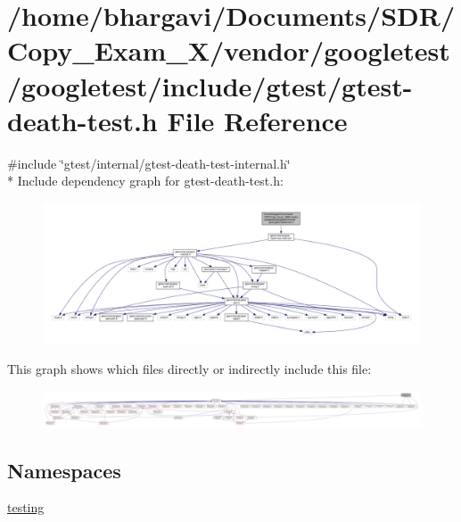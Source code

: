 \hypertarget{gtest-death-test_8h}{}\section{/home/bhargavi/\+Documents/\+S\+D\+R/\+Copy\+\_\+\+Exam\+\_\+X/vendor/googletest/googletest/include/gtest/gtest-\/death-\/test.h File Reference}
\label{gtest-death-test_8h}
{\ttfamily \#include \char`\"{}gtest/internal/gtest-\/death-\/test-\/internal.\+h\char`\"{}}\\*
Include dependency graph for gtest-\/death-\/test.h\+:
\nopagebreak
\begin{figure}[H]
\begin{center}
\leavevmode
\includegraphics[width=350pt]{gtest-death-test_8h__incl}
\end{center}
\end{figure}
This graph shows which files directly or indirectly include this file\+:
\nopagebreak
\begin{figure}[H]
\begin{center}
\leavevmode
\includegraphics[width=350pt]{gtest-death-test_8h__dep__incl}
\end{center}
\end{figure}
\subsection*{Namespaces}
\begin{DoxyCompactItemize}
\item 
 \hyperlink{namespacetesting}{testing}
\end{DoxyCompactItemize}
